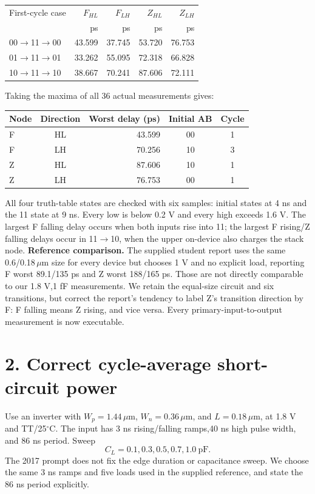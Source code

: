 \documentclass[11pt,a4paper]{article}
\begin{document}
\begin{center}\begin{tabular}{lrrrr}\toprule
First-cycle case&$F_{HL}$&$F_{LH}$&$Z_{HL}$&$Z_{LH}$\\
&ps&ps&ps&ps\\\midrule
00$\to$11$\to$00&43.599&37.745&53.720&76.753\\
01$\to$11$\to$01&33.262&55.095&72.318&66.828\\
10$\to$11$\to$10&38.667&70.241&87.606&72.111\\
\bottomrule\end{tabular}\end{center}
\newpage
Taking the maxima of all 36 actual measurements gives:
\begin{center}\begin{tabular}{lcrcc}\toprule
Node&Direction&Worst delay (ps)&Initial AB&Cycle\\\midrule
F&HL&43.599&00&1\\
F&LH&70.256&10&3\\
Z&HL&87.606&10&1\\
Z&LH&76.753&00&1\\
\bottomrule\end{tabular}\end{center}
All four truth-table states are checked with six samples: initial states at 4 ns and the 11 state at 9 ns. Every low is below 0.2 V and every high exceeds 1.6 V. The largest F falling delay occurs when both inputs rise into 11; the largest F rising/Z falling delays occur in 11$\to$10, when the upper on-device also charges the stack node.
\textbf{Reference comparison.} The supplied student report uses the same 0.6/0.18$\,\mu$m size for every device but chooses 1 V and no explicit load, reporting F worst 89.1/135 ps and Z worst 188/165 ps. Those are not directly comparable to our 1.8 V,1 fF measurements. We retain the equal-size circuit and six transitions, but correct the report's tendency to label Z's transition direction by F: F falling means Z rising, and vice versa. Every primary-input-to-output measurement is now executable.

\section*{2. Correct cycle-average short-circuit power}
Use an inverter with $W_p=1.44\,\mu$m, $W_n=0.36\,\mu$m, and $L=0.18\,\mu$m, at 1.8 V and TT/25$^\circ$C. The input has 3 ns rising/falling ramps,40 ns high pulse width, and 86 ns period. Sweep
\[
 C_L=0.1,0.3,0.5,0.7,1.0\ \mathrm{pF}.
\]
The 2017 prompt does not fix the edge duration or capacitance sweep. We choose the same 3 ns ramps and five loads used in the supplied reference, and state the 86 ns period explicitly.
\end{document}
